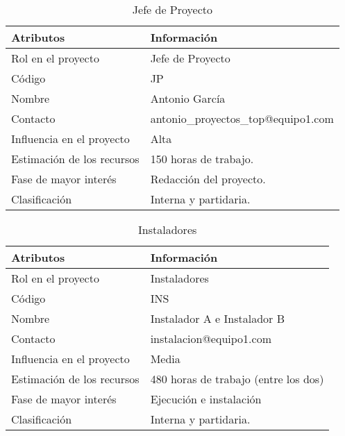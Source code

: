 \begin{table}[H]
\centering
\begin{tabular}{|m{5cm}|m{11cm}| }
\hline
\rowcolor{gray!50} \centering Atributos & Información  \\
\hline
\hline
 Rol en el proyecto & Jefe de Proyecto \\
 \hline
 Código & JP \\
 \hline
 Nombre & Antonio García \\
\hline
 Contacto & antonio\_proyectos\_top@equipo1.com \\
\hline
 Influencia en el proyecto & Alta \\
\hline
 Estimación de los recursos & 150 horas de trabajo. \\
\hline
 Fase de mayor interés & Redacción del proyecto.\\
\hline
Clasificación & Interna y partidaria.\\
 \hline
\end{tabular}
\caption{Jefe de Proyecto}
\label{table:ta1}
\end{table}

\begin{table}[H]
\centering
\begin{tabular}{|m{5cm}|m{11cm}| }
\hline
\rowcolor{gray!50} \centering Atributos & Información  \\
\hline
\hline
 Rol en el proyecto & Instaladores \\
 \hline
 Código & INS \\
 \hline
 Nombre & Instalador A e Instalador B \\
\hline
 Contacto & instalacion@equipo1.com \\
\hline
 Influencia en el proyecto & Media \\
\hline
 Estimación de los recursos & 480 horas de trabajo (entre los dos) \\
\hline
 Fase de mayor interés & Ejecución e instalación \\
\hline
Clasificación & Interna y partidaria.\\
 \hline
\end{tabular}
\caption{Instaladores}
\label{table:ta1}
\end{table}

